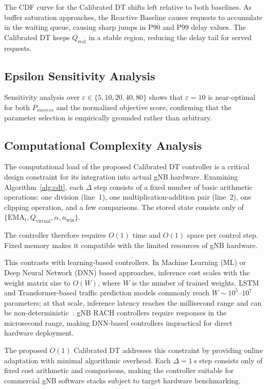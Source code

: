 \documentclass[conference]{IEEEtran}
\newcommand{\qreal}{Q_{\mathrm{real}}}
\newcommand{\qvirt}{Q_{\mathrm{virtual}}}
\newcommand{\ema}{\mathrm{EMA}}
\begin{document}
The CDF curve for the Calibrated DT shifts left relative to both baselines. As buffer saturation approaches, the Reactive Baseline causes requests to accumulate in the waiting queue, causing sharp jumps in P90 and P99 delay values. The Calibrated DT keeps $\qreal$ in a stable region, reducing the delay tail for served requests.

\subsection{Epsilon Sensitivity Analysis}

Sensitivity analysis over $\varepsilon \in \{5, 10, 20, 40, 80\}$ shows that $\varepsilon = 10$ is near-optimal for both $P_{success}$ and the normalized objective score, confirming that the parameter selection is empirically grounded rather than arbitrary.

\subsection{Computational Complexity Analysis}

The computational load of the proposed Calibrated DT controller is a critical design constraint for its integration into actual gNB hardware. Examining Algorithm~\ref{alg:cdt}, each $\Delta$ step consists of a fixed number of basic arithmetic operations: one division (line~1), one multiplication-addition pair (line~2), one clipping operation, and a few comparisons. The stored state consists only of $\{\ema_t, \qvirt, \alpha, n_{\mathrm{win}}\}$.

The controller therefore requires $O(1)$ time and $O(1)$ space per control step. Fixed memory makes it compatible with the limited resources of gNB hardware.

This contrasts with learning-based controllers. In Machine Learning (ML) or Deep Neural Network (DNN) based approaches, inference cost scales with the weight matrix size to $O(W)$, where $W$ is the number of trained weights. LSTM and Transformer-based traffic prediction models commonly reach $W \sim 10^5$--$10^7$ parameters; at that scale, inference latency reaches the millisecond range and can be non-deterministic~\cite{b9}. gNB RACH controllers require responses in the microsecond range, making DNN-based controllers impractical for direct hardware deployment.

The proposed $O(1)$ Calibrated DT addresses this constraint by providing online adaptation with minimal algorithmic overhead. Each $\Delta = 1\ \mathrm{s}$ step consists only of fixed cost arithmetic and comparisons, making the controller suitable for commercial gNB software stacks subject to target hardware benchmarking.
\end{document}
